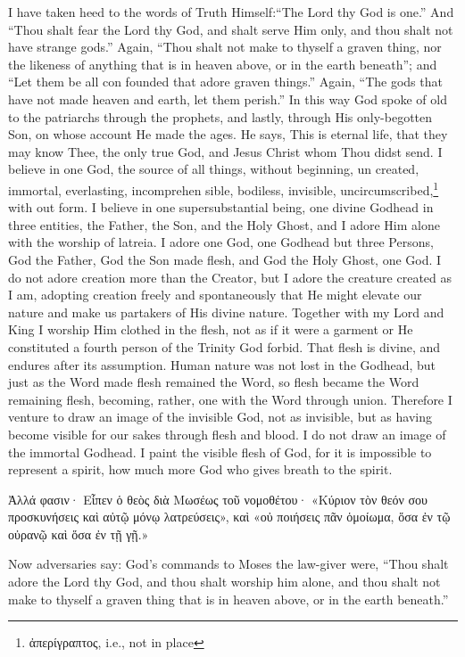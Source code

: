 \documentclass[10pt]{book}
\newcommand{\switchGreek}[1][]{\selectlanguage{polutonikogreek} \switchcolumn*[#1]}
\newcommand{\switchEnglish}{\selectlanguage{english} \switchcolumn}
\begin{document}
\begin{paracol}{2}
I have taken heed to the words of Truth 
Himself:\textemdash ``The Lord thy God is one.'' And 
``Thou shalt fear the Lord thy God, and shalt 
serve Him only, and thou shalt not have 
strange gods.'' Again, ``Thou shalt not make 
to thyself a graven thing, nor the likeness of 
anything that is in heaven above, or in the 
earth beneath''; and ``Let them be all con 
founded that adore graven things.'' Again, 
``The gods that have not made heaven and 
earth, let them perish.'' In this way God spoke 
of old to the patriarchs through the prophets, 
and lastly, through His only-begotten Son, on 
whose account He made the ages. He says, 
This is eternal life, that they may know Thee, 
the only true God, and Jesus Christ whom 
Thou didst send. I believe in one God, the 
source of all things, without beginning, un 
created, immortal, everlasting, incomprehen 
sible, bodiless, invisible, uncircumscribed,\footnote{ἀπερίγραπτος, i.e., not in place} with 
out form. I believe in one supersubstantial 
being, one divine Godhead in three entities, 
the Father, the Son, and the Holy Ghost, 
and I adore Him alone with the worship 
of latreia. I adore one God, one Godhead 
but three Persons, God the Father, God the 
Son made flesh, and God the Holy Ghost, one 
God. I do not adore creation more than the 
Creator, but I adore the creature created as I 
am, adopting creation freely and spontaneously 
that He might elevate our nature and make us 
partakers of His divine nature. Together with 
my Lord and King I worship Him clothed in 
the flesh, not as if it were a garment or He 
constituted a fourth person of the Trinity\textemdash 
God forbid. That flesh is divine, and endures 
after its assumption. Human nature was not 
lost in the Godhead, but just as the Word 
made flesh remained the Word, so flesh became 
the Word remaining flesh, becoming, rather, 
one with the Word through union. Therefore I venture to draw an image 
of the invisible God, not as invisible, but as 
having become visible for our sakes through 
flesh and blood. I do not draw an image of 
the immortal Godhead. I paint the visible 
flesh of God, for it is impossible to represent 
a spirit, how much more God who gives 
breath to the spirit.

\switchGreek

Ἀλλά φασιν· Εἶπεν ὁ θεὸς διὰ Μωσέως τοῦ νομοθέτου· «Κύριον τὸν θεόν σου προσκυνήσεις καὶ αὐτῷ μόνῳ λατρεύσεις», καὶ «οὐ ποιήσεις πᾶν ὁμοίωμα, ὅσα ἐν τῷ οὐρανῷ καὶ ὅσα ἐν τῇ γῇ.»

\switchEnglish

Now adversaries say: God's commands to 
Moses the law-giver were, ``Thou shalt adore 
the Lord thy God, and thou shalt worship him 
alone, and thou shalt not make to thyself a 
graven thing that is in heaven above, or in the 
earth beneath.'' 


\end{paracol}
\end{document}
